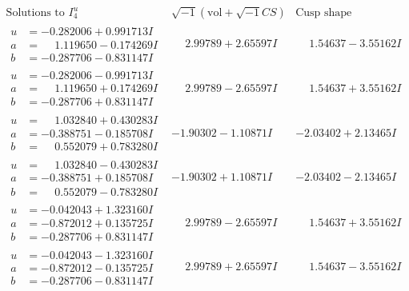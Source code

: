 \documentclass[1p]{elsarticle_modified}
\theoremstyle{definition}
\newcommand{\I}{\sqrt{-1}}
\begin{document}
$$\begin{array}{c|c|c}  
\text{Solutions to }I^u_{4}& \I (\text{vol} + \sqrt{-1}CS) & \text{Cusp shape}\\
 \hline 
\begin{aligned}
u &= -0.282006 + 0.991713 I \\
a &= \phantom{-}1.119650 - 0.174269 I \\
b &= -0.287706 - 0.831147 I\end{aligned}
 & \phantom{-}2.99789 + 2.65597 I & \phantom{-}1.54637 - 3.55162 I \\ \hline\begin{aligned}
u &= -0.282006 - 0.991713 I \\
a &= \phantom{-}1.119650 + 0.174269 I \\
b &= -0.287706 + 0.831147 I\end{aligned}
 & \phantom{-}2.99789 - 2.65597 I & \phantom{-}1.54637 + 3.55162 I \\ \hline\begin{aligned}
u &= \phantom{-}1.032840 + 0.430283 I \\
a &= -0.388751 - 0.185708 I \\
b &= \phantom{-}0.552079 + 0.783280 I\end{aligned}
 & -1.90302 - 1.10871 I & -2.03402 + 2.13465 I \\ \hline\begin{aligned}
u &= \phantom{-}1.032840 - 0.430283 I \\
a &= -0.388751 + 0.185708 I \\
b &= \phantom{-}0.552079 - 0.783280 I\end{aligned}
 & -1.90302 + 1.10871 I & -2.03402 - 2.13465 I \\ \hline\begin{aligned}
u &= -0.042043 + 1.323160 I \\
a &= -0.872012 + 0.135725 I \\
b &= -0.287706 + 0.831147 I\end{aligned}
 & \phantom{-}2.99789 - 2.65597 I & \phantom{-}1.54637 + 3.55162 I \\ \hline\begin{aligned}
u &= -0.042043 - 1.323160 I \\
a &= -0.872012 - 0.135725 I \\
b &= -0.287706 - 0.831147 I\end{aligned}
 & \phantom{-}2.99789 + 2.65597 I & \phantom{-}1.54637 - 3.55162 I \\ \hline\begin{aligned}

\end{aligned}
\end{array}$$
\end{document}
